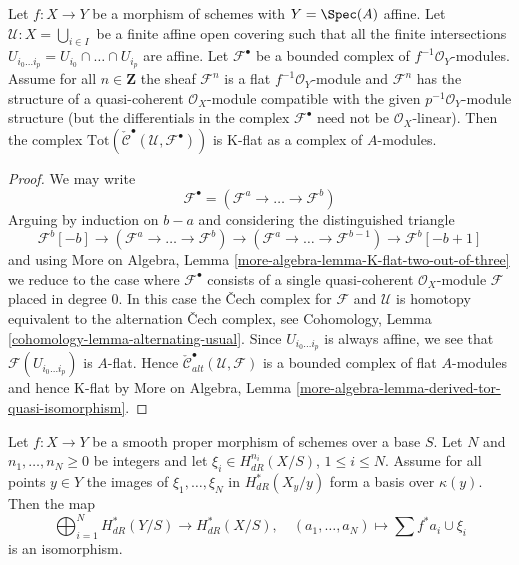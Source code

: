 \begin{lemma}
\label{lemma-K-flat}
Let $f : X \to Y$ be a morphism of schemes with $Y = \Spec(A)$ affine.
Let $\mathcal{U} : X = \bigcup_{i \in I}$ be a finite affine open covering
such that all the finite intersections
$U_{i_0 \ldots i_p} = U_{i_0} \cap \ldots \cap U_{i_p}$
are affine. Let $\mathcal{F}^\bullet$ be a bounded complex of
$f^{-1}\mathcal{O}_Y$-modules. Assume for all $n \in \mathbf{Z}$
the sheaf $\mathcal{F}^n$ is a flat $f^{-1}\mathcal{O}_Y$-module and
$\mathcal{F}^n$ has the structure of a quasi-coherent $\mathcal{O}_X$-module
compatible with the given $p^{-1}\mathcal{O}_Y$-module structure (but the
differentials in the complex $\mathcal{F}^\bullet$ need not
be $\mathcal{O}_X$-linear). Then the complex
$\text{Tot}(\check{\mathcal{C}}^\bullet(\mathcal{U}, \mathcal{F}^\bullet))$
is K-flat as a complex of $A$-modules.
\end{lemma}

\begin{proof}
We may write
$$
\mathcal{F}^\bullet = (\mathcal{F}^a \to \ldots \to \mathcal{F}^b)
$$
Arguing by induction on $b - a$ and considering the distinguished triangle
$$
\mathcal{F}^b[-b] \to (\mathcal{F}^a \to \ldots \to \mathcal{F}^b)
\to (\mathcal{F}^a \to \ldots \to \mathcal{F}^{b - 1}) \to
\mathcal{F}^b[-b + 1]
$$
and using
More on Algebra, Lemma \ref{more-algebra-lemma-K-flat-two-out-of-three}
we reduce to the case where $\mathcal{F}^\bullet$ consists of a
single quasi-coherent $\mathcal{O}_X$-module $\mathcal{F}$
placed in degree $0$. In this case the {\v C}ech complex
for $\mathcal{F}$ and $\mathcal{U}$ is homotopy equivalent to the
alternation {\v C}ech complex, see
Cohomology, Lemma \ref{cohomology-lemma-alternating-usual}.
Since $U_{i_0 \ldots i_p}$ is always affine, we see that
$\mathcal{F}(U_{i_0 \ldots i_p})$ is $A$-flat.
Hence
$\check{\mathcal{C}}_{alt}^\bullet(\mathcal{U}, \mathcal{F})$
is a bounded complex of flat $A$-modules and hence K-flat
by More on Algebra, Lemma
\ref{more-algebra-lemma-derived-tor-quasi-isomorphism}.
\end{proof}

\begin{proposition}
\label{proposition-global-generation-on-fibres}
Let $f : X \to Y$ be a smooth proper morphism of schemes over a base $S$.
Let $N$ and $n_1, \ldots, n_N \geq 0$ be integers and let
$\xi_i \in H^{n_i}_{dR}(X/S)$, $1 \leq i \leq N$.
Assume for all points $y \in Y$ the images of $\xi_1, \ldots, \xi_N$
in $H^*_{dR}(X_y/y)$ form a basis over $\kappa(y)$. Then the map
$$
\bigoplus\nolimits_{i = 1}^N H^*_{dR}(Y/S) \longrightarrow
H^*_{dR}(X/S), \quad
(a_1, \ldots, a_N) \longmapsto  \sum f^*a_i \cup \xi_i
$$
is an isomorphism.
\end{proposition}

